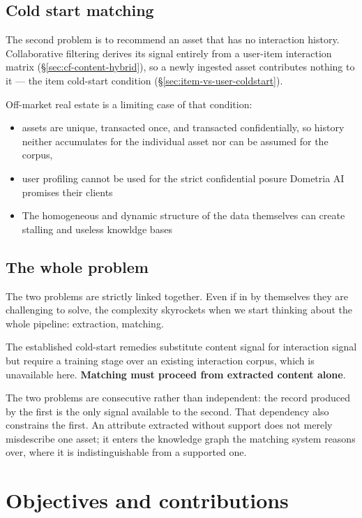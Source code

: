 \subsection{Cold start matching}
The second problem is to recommend an asset that has no interaction history. Collaborative filtering derives its signal entirely from a user-item interaction matrix (\S\ref{sec:cf-content-hybrid}), so a newly ingested asset contributes nothing to it — the item cold-start condition (\S\ref{sec:item-vs-user-coldstart}). 

Off-market real estate is a limiting case of that condition: 
\begin{itemize}
\item assets are unique, transacted once, and transacted confidentially, so history neither accumulates for the individual asset nor can be assumed for the corpus,
\item user profiling cannot be used for the strict confidential posure Dometria AI promises their clients
\item The homogeneous and dynamic structure of the data themselves can create stalling and useless knowldge bases
\end{itemize}

\subsection{The whole problem}
The two problems are strictly linked together. Even if in by themselves they are challenging to solve, the complexity skyrockets when we start thinking about the whole pipeline: extraction, matching.


The established cold-start remedies substitute content signal for interaction signal but require a training stage over an existing interaction corpus, which is unavailable here. \textbf{Matching must proceed from extracted content alone}.


The two problems are consecutive rather than independent: the record produced by the first is the only signal available to the second. That dependency also constrains the first. An attribute extracted without support does not merely misdescribe one asset; it enters the knowledge graph the matching system reasons over, where it is indistinguishable from a supported one.

\section{Objectives and contributions}
\label{sec:intro-contributions}

